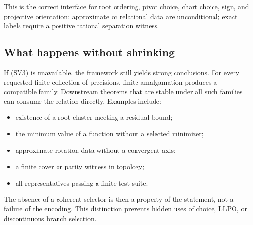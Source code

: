 This is the correct interface for root ordering, pivot choice, chart choice,
sign, and projective orientation: approximate or relational data are
unconditional; exact labels require a positive rational separation witness.

\subsection{What happens without shrinking}

If (SV3) is unavailable, the framework still yields strong conclusions.
For every requested finite collection of precisions, finite amalgamation
produces a compatible family.  Downstream theorems that are stable under all
such families can consume the relation directly.  Examples include:

\begin{itemize}
\item existence of a root cluster meeting a residual bound;
\item the minimum value of a function without a selected minimizer;
\item approximate rotation data without a convergent axis;
\item a finite cover or parity witness in topology;
\item all representatives passing a finite test suite.
\end{itemize}

The absence of a coherent selector is then a property of the statement, not a
failure of the encoding.  This distinction prevents hidden uses of choice,
LLPO, or discontinuous branch selection.
